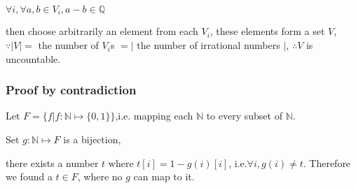 \documentclass[12pt,a4paper]{ctexrep}
\begin{document}
$\forall i, \forall a,b \in V_i, a-b \in \mathbb{Q}$

then choose arbitrarily an element from each $V_i$, these elements form a set $V$, $\because |V| = $ the number of $V_i$s $= |$ the number of irrational numbers $|$, $\therefore V $ is uncountable.

\subsubsection{Proof by contradiction}
Let $F = \{f|f:\mathbb{N}\mapsto\{0,1\}\}$,i.e. mapping each $\mathbb{N}$ to every subset of $\mathbb{N}$.

Set $g:\mathbb{N}\mapsto F$ is a bijection, 

there exists a number $t$ where $t[i] = 1-g(i)[i]$, i.e.$\forall i, g(i) \neq t$. Therefore we found a $t \in F$, where no $g$ can map to it. 

\ifdebug
\end{document}

